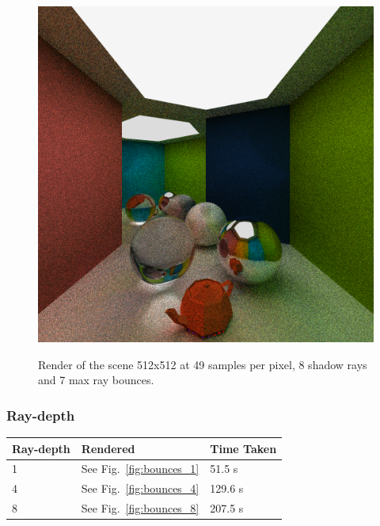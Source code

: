 \documentclass[a4paper, twocolumn]{article}
\begin{document}
            \begin{figure}[H]
                \centering
                \caption{Render of the scene 512x512 at 49 samples per pixel, 8 shadow rays and 7 max ray bounces.}
                \includegraphics[width=0.8\linewidth]{share/results/shadow_rays_4.png}
                \label{fig:shadow_rays_8}
            \end{figure}

            \subsubsection*{Ray-depth}

            \begin{table}[H]
            \centering
            \begin{tabular}{lll}
                \toprule
                \textbf{Ray-depth}&\textbf{Rendered}&\textbf{Time Taken}\\
                \midrule
                1&See Fig.~\ref{fig:bounces_1}&51.5 s\\
                4&See Fig.~\ref{fig:bounces_4}&129.6 s\\
                8&See Fig.~\ref{fig:bounces_8}&207.5 s\\
                \bottomrule
            \end{tabular}
            \label{tab:depth_rays}
            \end{table}
\end{document}
